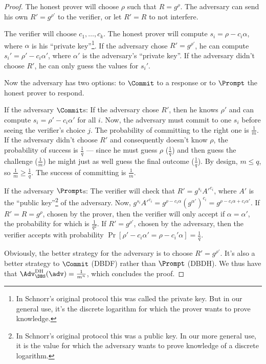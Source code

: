 \begin{proof}
  The honest prover will choose \(\rho\) such that \(R = g^\rho\).
  The adversary can send his own \(R' = g^{\rho'}\) to the verifier, or let 
  \(R' = R\) to not interfere.

  The verifier will choose \(c_1, \dotsc, c_k\).
  The honest prover will compute \(s_i = \rho - c_i \alpha\), where \(\alpha\) 
  is his \enquote{private key}\footnote{%
    In Schnorr's original protocol this was called the private key.
    But in our general use, it's the discrete logarithm for which the prover 
    wants to prove knowledge.
  }.
  If the adversary chose \(R' = g^{\rho'}\), he can compute \(s_i' = \rho' - 
  c_i \alpha'\), where \(\alpha'\) is the adversary's \enquote{private key}.
  If the adversary didn't choose \(R'\), he can only guess the values for 
  \(s_i'\).

  Now the adversary has two options:
  to \(\Commit\) to a response or to \(\Prompt\) the honest prover to respond.

  If the adversary \(\Commit\)s:
  If the adversary chose \(R'\), then he knows \(\rho'\) and can compute \(s_i 
  = \rho' - c_i \alpha'\) for all \(i\).
  Now, the adversary must commit to one \(s_i\) before seeing the verifier's 
  choice \(j\).
  The probability of committing to the right one is \(\frac{1}{m}\).
  If the adversary didn't choose \(R'\) and consequently doesn't know \(\rho\), 
  the probability of success is \(\frac{1}{q}\) --- since he must guess 
  \(\rho\) (\(\frac{1}{q}\)) and then guess the challenge (\(\frac{1}{m}\)) he 
  might just as well guess the final outcome (\(\frac{1}{q}\)).
  By design, \(m \leq q\), so \(\frac{1}{m} \geq \frac{1}{q}\).
  The success of committing is \(\frac{1}{m}\).

  If the adversary \(\Prompt\)s:
  The verifier will check that \(R' = g^{s_i} A'^{c_i}\), where \(A'\) is the 
  \enquote{public key}\footnote{%
    In Schnorr's original protocol this was a public key.
    In our more general use, it is the value for which the adversary wants to 
    prove knowledge of a discrete logarithm.
  } of the adversary.
  Now, \(g^{s_i} A'^{c_i} = g^{\rho - c_i \alpha} (g^{\alpha'})^{c_i} = g^{\rho 
  - c_i \alpha + c_i \alpha'}\).
  If \(R' = R = g^\rho\), chosen by the prover, then the verifier will only 
  accept if \(\alpha = \alpha'\), the probability for which is 
  \(\frac{1}{q^2}\).
  If \(R' = g^{\rho'}\), chosen by the adversary, then the verifier accepts 
  with probability \(\Pr[\rho' - c_i \alpha' = \rho - c_i' \alpha] = 
  \frac{1}{q}\).

  Obviously, the better strategy for the adversary is to choose \(R' = 
  g^{\rho'}\).
  It's also a better strategy to \(\Commit\) (\ac{DBDF}) rather than 
  \(\Prompt\) (\ac{DBDH}).
  We thus have that
  \(\Adv_{\DBS}^{\text{DH}}(\adv) = \frac{1}{m^n}\),
  which concludes the proof.
\end{proof}



